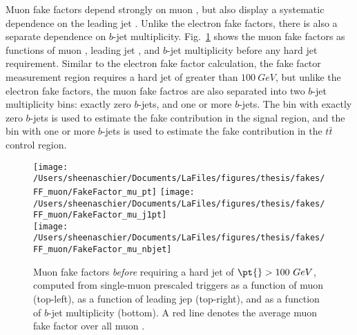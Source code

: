 Muon fake factors depend strongly on muon \pt, but also display a systematic dependence on the leading jet \pt{}.  Unlike the electron fake factors, there is also a separate dependence on $b$-jet multiplicity.  Fig.~\ref{fig:muon_FF_hist_noCut} shows the muon fake factors as functions of muon \pt{}, leading jet \pt{}, and $b$-jet multiplicity before any hard jet requirement.  Similar to the electron fake factor calculation, the fake factor measurement region requires a hard jet of \pt{} greater than $100~GeV$, but unlike the electron fake factors, the muon fake factros are also separated into two $b$-jet multiplicity bins: exactly zero $b$-jets, and one or more $b$-jets.  The bin with exactly zero $b$-jets is used to estimate the fake contribution in the signal region, and the bin with one or more $b$-jets is used to estimate the fake contribution in the $t\bar{t}$ control region.

\begin{figure}[tbp]
  \centering
  \texttt{[image: /Users/sheenaschier/Documents/LaFiles/figures/thesis/fakes/FF\_muon/FakeFactor\_mu\_pt]}
  \texttt{[image: /Users/sheenaschier/Documents/LaFiles/figures/thesis/fakes/FF\_muon/FakeFactor\_mu\_j1pt]}\\
  \texttt{[image: /Users/sheenaschier/Documents/LaFiles/figures/thesis/fakes/FF\_muon/FakeFactor\_mu\_nbjet]}\\
  \caption{Muon fake factors \textit{before} requiring a hard jet of $\pt{}> 100~GeV$, computed from single-muon prescaled triggers as a function of muon \pt{} (top-left), as a function of leading jep \pt{} (top-right), and as a function of $b$-jet multiplicity (bottom). A red line denotes the average muon fake factor over all muon \pt{}.}
  \label{fig:muon_FF_hist_noCut}
\end{figure}

